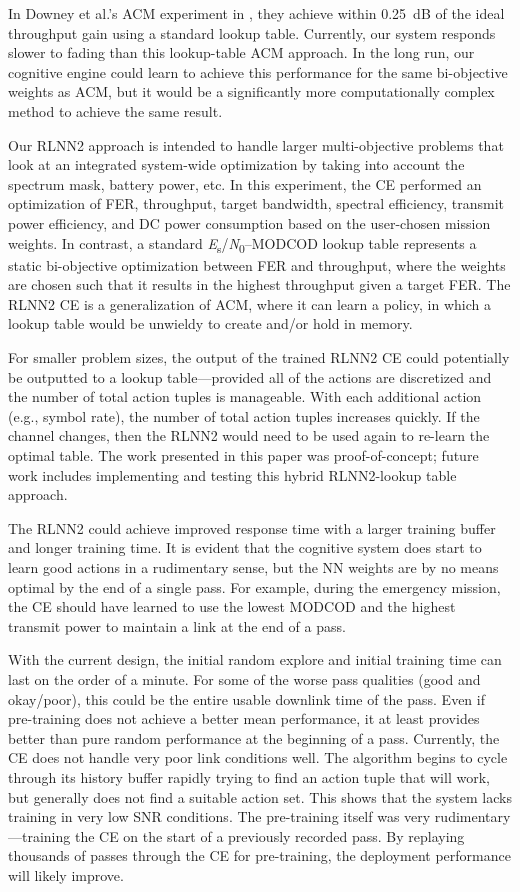 \documentclass[journal]{IEEEtran}
\begin{document}
In Downey et al.'s ACM experiment in \cite{downey-paper}, they achieve within 0.25~dB of the ideal throughput gain using a standard lookup table.  Currently, our system responds slower to fading than this lookup-table ACM approach.  In the long run, our cognitive engine could learn to achieve this performance for the same bi-objective weights as ACM, but it would be a significantly more computationally complex method to achieve the same result.

Our RLNN2 approach is intended to handle larger multi-objective problems that look at an integrated system-wide optimization by taking into account the spectrum mask, battery power, etc.  In this experiment, the CE performed an optimization of FER, throughput, target bandwidth, spectral efficiency, transmit power efficiency, and DC power consumption based on the user-chosen mission weights.  In contrast, a standard \textit{E}\textsubscript{s}/\textit{N}\textsubscript{0}--MODCOD lookup table represents a static bi-objective optimization between FER and throughput, where the weights are chosen such that it results in the highest throughput given a target FER.  The RLNN2 CE is a generalization of ACM, where it can learn a policy, in which a lookup table would be unwieldy to create and/or hold in memory.

For smaller problem sizes, the output of the trained RLNN2 CE could potentially be outputted to a lookup table---provided all of the actions are discretized and the number of total action tuples is manageable.  With each additional action (e.g., symbol rate), the number of total action tuples increases quickly.  If the channel changes, then the RLNN2 would need to be used again to re-learn the optimal table.  The work presented in this paper was proof-of-concept; future work includes implementing and testing this hybrid RLNN2-lookup table approach.

The RLNN2 could achieve improved response time with a larger training buffer and longer training time.  It is evident that the cognitive system does start to learn good actions in a rudimentary sense, but the NN weights are by no means optimal by the end of a single pass.  For example, during the emergency mission, the CE should have learned to use the lowest MODCOD and the highest transmit power to maintain a link at the end of a pass.

With the current design, the initial random explore and initial training time can last on the order of a minute.  For some of the worse pass qualities (good and okay/poor), this could be the entire usable downlink time of the pass.  Even if pre-training does not achieve a better mean performance, it at least provides better than pure random performance at the beginning of a pass.  Currently, the CE does not handle very poor link conditions well.  The algorithm begins to cycle through its history buffer rapidly trying to find an action tuple that will work, but generally does not find a suitable action set.  This shows that the system lacks training in very low SNR conditions.  The pre-training itself was very rudimentary---training the CE on the start of a previously recorded pass.  By replaying thousands of passes through the CE for pre-training, the deployment performance will likely improve.
\end{document}
